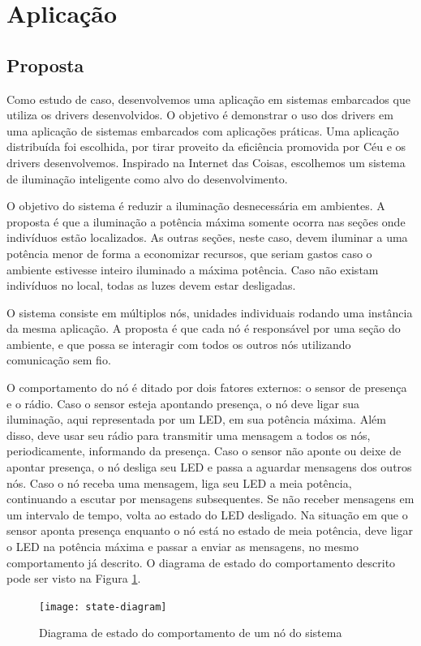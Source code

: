 \documentclass[11pt]{article}
\begin{document}
\section{Aplicação}
\subsection{Proposta}
\tab Como estudo de caso, desenvolvemos uma aplicação em sistemas embarcados que utiliza os drivers desenvolvidos. O objetivo é demonstrar o uso dos drivers em uma aplicação de sistemas embarcados com aplicações práticas. Uma aplicação distribuída foi escolhida, por tirar proveito da eficiência promovida por Céu e os drivers desenvolvemos. Inspirado na Internet das Coisas, escolhemos um sistema de iluminação inteligente como alvo do desenvolvimento.
\par O objetivo do sistema é reduzir a iluminação desnecessária em ambientes. A proposta é que a iluminação a potência máxima somente ocorra nas seções onde indivíduos estão localizados. As outras seções, neste caso, devem iluminar a uma potência menor de forma a economizar recursos, que seriam gastos caso o ambiente estivesse inteiro iluminado a máxima potência. Caso não existam indivíduos no local, todas as luzes devem estar desligadas.
\par O sistema consiste em múltiplos nós, unidades individuais rodando uma instância da mesma aplicação. A proposta é que cada nó é responsável por uma seção do ambiente, e que possa se interagir com todos os outros nós utilizando comunicação sem fio.
\par O comportamento do nó é ditado por dois fatores externos: o sensor de presença e o rádio. Caso o sensor esteja apontando presença, o nó deve ligar sua iluminação, aqui representada por um LED, em sua potência máxima. Além disso, deve usar seu rádio para transmitir uma mensagem a todos os nós, periodicamente, informando da presença. Caso o sensor não aponte ou deixe de apontar presença, o nó desliga seu LED e passa a aguardar mensagens dos outros nós. Caso o nó receba uma mensagem, liga seu LED a meia potência, continuando a escutar por mensagens subsequentes. Se não receber mensagens em um intervalo de tempo, volta ao estado do LED desligado. Na situação em que o sensor aponta presença enquanto o nó está no estado de meia potência, deve ligar o LED na potência máxima e passar a enviar as mensagens, no mesmo comportamento já descrito. O diagrama de estado do comportamento descrito pode ser visto na Figura \ref{state-diagram}.
\begin{figure}
    \centering
    \texttt{[image: state-diagram]}
    \caption{Diagrama de estado do comportamento de um nó do sistema}
    \label{state-diagram}
\end{figure}
\end{document}
